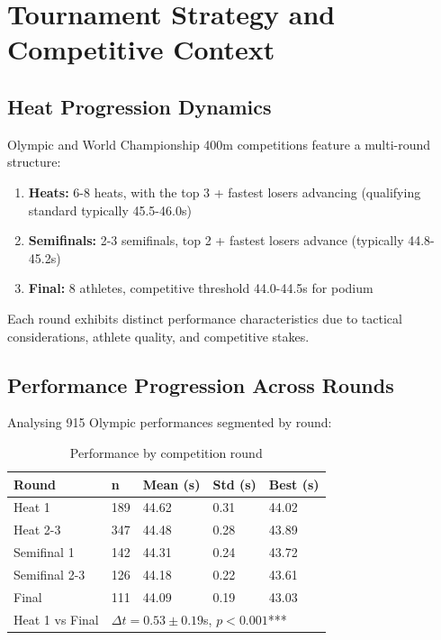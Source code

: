 \section{Tournament Strategy and Competitive Context}

\subsection{Heat Progression Dynamics}

Olympic and World Championship 400m competitions feature a multi-round structure:
\begin{enumerate}
    \item \textbf{Heats:} 6-8 heats, with the top 3 + fastest losers advancing (qualifying standard typically 45.5-46.0s)
    \item \textbf{Semifinals:} 2-3 semifinals, top 2 + fastest losers advance (typically 44.8-45.2s)
    \item \textbf{Final:} 8 athletes, competitive threshold 44.0-44.5s for podium
\end{enumerate}

Each round exhibits distinct performance characteristics due to tactical considerations, athlete quality, and competitive stakes.

\subsection{Performance Progression Across Rounds}

Analysing 915 Olympic performances segmented by round:

\begin{table}[H]
\centering
\caption{Performance by competition round}
\begin{tabular}{@{}lllll@{}}
\toprule
\textbf{Round} & \textbf{n} & \textbf{Mean (s)} & \textbf{Std (s)} & \textbf{Best (s)} \\
\midrule
Heat 1 & 189 & 44.62 & 0.31 & 44.02 \\
Heat 2-3 & 347 & 44.48 & 0.28 & 43.89 \\
Semifinal 1 & 142 & 44.31 & 0.24 & 43.72 \\
Semifinal 2-3 & 126 & 44.18 & 0.22 & 43.61 \\
Final & 111 & 44.09 & 0.19 & 43.03 \\
\midrule
Heat 1 vs Final & \multicolumn{4}{l}{$\Delta t = 0.53 \pm 0.19$s, $p < 0.001$***} \\
\bottomrule
\end{tabular}
\end{table}

